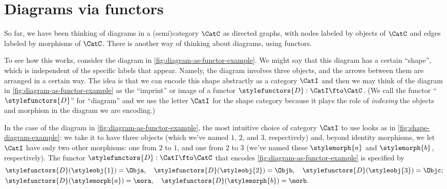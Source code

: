 
\section{Diagrams via functors}



So far, we have been thinking of diagrams in a (semi)category $\CatC$ as directed graphs, with nodes labeled by objects of $\CatC$ and edges labeled by morphisms of $\CatC$. There is another way of thinking about diagrams, using functors. 

To see how this works, consider the diagram in \cref{fig:diagram-as-functor-example}. We might say that this diagram has a certain ``shape'', which is independent of the specific labels that appear. Namely, the diagram involves three objects, and the arrows between them are arranged in a certain way. The idea is that we can encode this shape abstractly as a category $\CatI$ and then we may think of the diagram in \cref{fig:diagram-as-functor-example} as the ``imprint'' or image of a functor $\stylefunctors{D}: \CatI \fto \CatC$. (We call the functor ``$\stylefunctors{D}$'' for ``diagram'' and we use the letter $\CatI$ for the shape category because it plays the role of \emph{indexing} the objects and morphism in the diagram we are encoding.)

\begin{marginfigure}
    \centering
    \caption{}
    \label{fig:diagram-as-functor-example}
\end{marginfigure}

\begin{marginfigure}
    \centering
    \caption{}
    \label{fig:shape-diagram-example}
\end{marginfigure}


In the case of the diagram in \cref{fig:diagram-as-functor-example}, the most intuitive choice of category $\CatI$ to use looks as in \cref{fig:shape-diagram-example}: we take it to have three objects (which we've named $1$, $2$, and $3$, respectively) and, beyond identity morphisms, we let $\CatI$ have only two other morphisms: one from $2$ to $1$, and one from $2$ to $3$ (we've named these $\stylemorph{a}$ and $\stylemorph{b}$, respectively). The functor $\stylefunctors{D}: \CatI \fto \CatC$ that encodes \cref{fig:diagram-as-functor-example} is specified by 
\begin{align*}
& \stylefunctors{D}(\styleobj{1}) = \Obja, \quad \stylefunctors{D}(\styleobj{2}) = \Objb, \quad  \stylefunctors{D}(\styleobj{3}) = \Objc;  \\
& \stylefunctors{D}(\stylemorph{a}) = \mora, \quad \stylefunctors{D}(\stylemorph{b}) = \morb.
\end{align*}


